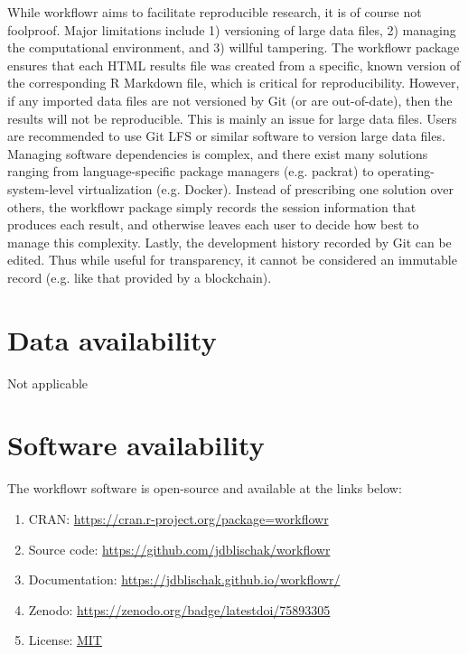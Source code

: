 \documentclass[9pt,a4paper]{extarticle}
\begin{document}
While workflowr aims to facilitate reproducible research, it is of
course not foolproof. Major limitations include 1) versioning of large
data files, 2) managing the computational environment, and 3) willful
tampering. The workflowr package ensures that each HTML results file was
created from a specific, known version of the corresponding R Markdown
file, which is critical for reproducibility. However, if any imported
data files are not versioned by Git (or are out-of-date), then the
results will not be reproducible. This is mainly an issue for large data
files. Users are recommended to use Git LFS or similar software to
version large data files. Managing software dependencies is complex, and
there exist many solutions ranging from language-specific package
managers (e.g. packrat) to operating-system-level virtualization (e.g.
Docker). Instead of prescribing one solution over others, the workflowr
package simply records the session information that produces each
result, and otherwise leaves each user to decide how best to manage this
complexity. Lastly, the development history recorded by Git can be
edited. Thus while useful for transparency, it cannot be considered an
immutable record (e.g. like that provided by a blockchain).


\section*{Data availability}

Not applicable


\section*{Software availability}

The workflowr software is open-source and available at the links below:

\begin{enumerate}

\item CRAN: \url{https://cran.r-project.org/package=workflowr}

\item Source code: \url{https://github.com/jdblischak/workflowr}

\item Documentation: \url{https://jdblischak.github.io/workflowr/}

\item Zenodo: \url{https://zenodo.org/badge/latestdoi/75893305}

\item License: \href{https://choosealicense.com/licenses/mit/}{MIT}

\end{enumerate}
\end{document}
